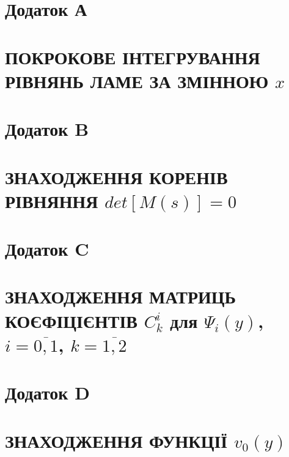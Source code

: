 \documentclass[a4paper,10pt]{extarticle}
\numberwithin{equation}{section}
\begin{document}
\section*{\centering Додаток А}\label{ap_A}
\section*{\centering ПОКРОКОВЕ ІНТЕГРУВАННЯ РІВНЯНЬ ЛАМЕ ЗА ЗМІННОЮ $x$}


\section*{\centering Додаток B}\label{ap_B}
\section*{\centering ЗНАХОДЖЕННЯ КОРЕНІВ РІВНЯННЯ $det[M(s)]=0$}


\section*{\centering Додаток C}\label{ap_C}
\section*{\centering ЗНАХОДЖЕННЯ МАТРИЦЬ КОЄФІЦІЄНТІВ $C_k^i$ для $\Psi_i(y)$, $i=\overline{0,1}$, $k=\overline{1,2}$}


\section*{\centering Додаток D}\label{ap_D}
\section*{\centering ЗНАХОДЖЕННЯ ФУНКЦІЇ $v_0(y)$}

\end{document}

